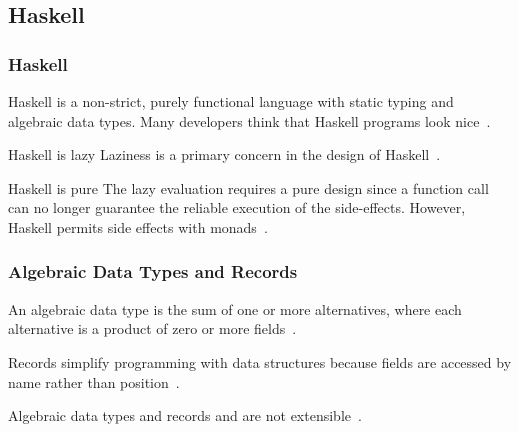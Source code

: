 \subsection{Haskell}
\begin{frame}\frametitle{Haskell}

Haskell is a non-strict, purely functional language with static typing and algebraic data types. Many developers think that Haskell programs look nice~\cite{history-of-haskell}.

\begin{block}{Haskell is lazy}
    Laziness is a primary concern in the design of Haskell~\cite{history-of-haskell}.
\end{block}

\begin{block}{Haskell is pure}
The lazy evaluation requires a pure design since a function call can no longer guarantee the reliable execution of the side-effects. However, Haskell permits side effects with monads~\cite{history-of-haskell}.
\end{block}

\end{frame}

\begin{frame}[allowframebreaks]\frametitle{Algebraic Data Types and Records}

An algebraic data type is the sum of one or more alternatives, where each alternative is a product of zero or more fields~\cite{history-of-haskell}. 
        

Records simplify programming with data structures because fields are accessed by name rather than position~\cite{lw-ext-records}.



Algebraic data types and records and are not extensible~\cite{lw-ext-records,trees-that-grow}. 

\end{frame}
